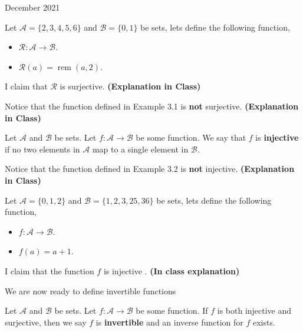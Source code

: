 \documentclass[12pt,oneside]{book} %
\begin{document}
\begin{lec}{December 2021}
\begin{ex}
  Let $ \mathcal{A} = \{2,3,4,5,6\} $ and $ \mathcal{B} = \{0,1\} $ be sets, lets define the
  following function, 
  \begin{itemize}
    \item $\mathcal{R} \colon \mathcal{A} \to \mathcal{B}$.
    \item $\mathcal{R}(a) = \operatorname{rem}(a,2)$.
  \end{itemize}
  I claim that $\mathcal{R}$ is surjective. \textbf{(Explanation in Class)}
\end{ex}

\begin{ex}
  Notice that the function defined in Example 3.1 is \textbf{not} surjective. \textbf{(Explanation in Class)}
\end{ex}

\begin{defn}
    Let $\mathcal{A}$ and $\mathcal{B}$ be sets. Let $f \colon \mathcal{A} \to \mathcal{B}$ be some function. We say that $f$ is
    \textbf{injective} if no two elements in $\mathcal{A}$ map to a single element in $\mathcal{B}$.
\end{defn}

\begin{ex}
  Notice that the function defined in Example 3.2 is \textbf{not} injective. \textbf{(Explanation in Class)}
\end{ex}

\newpage

\begin{ex}
  Let $ \mathcal{A} = \{0,1,2\} $ and $ \mathcal{B} = \{1,2,3,25,36\} $ be sets, lets define the
  following function, 
  \begin{itemize}
    \item $f \colon \mathcal{A} \to \mathcal{B}$.
    \item $f(a) = a + 1$.
  \end{itemize}
  I claim that the function $f$ is injective . \textbf{(In class explanation)}
\end{ex}

We are now ready to define invertible functions

\begin{defn}
    Let $\mathcal{A}$ and $\mathcal{B}$ be sets. Let $f \colon \mathcal{A} \to \mathcal{B}$ be some function. If $f$ is both
    injective and surjective, then we say $f$ is \textbf{invertible} and an inverse function for $f$ exists.
\end{defn}



\end{lec}
\end{document}

